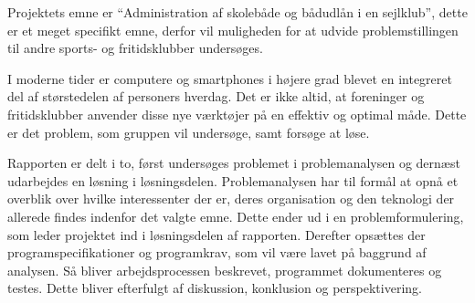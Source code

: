 Projektets emne er ``Administration af skolebåde og bådudlån i en sejlklub'', dette er et meget specifikt emne, derfor vil muligheden for at udvide problemstillingen til andre sports- og fritidsklubber undersøges.

I moderne tider er computere og smartphones i højere grad blevet en integreret del af størstedelen af personers hverdag.  \citep{dstSPogPC} 
Det er ikke altid, at foreninger og fritidsklubber anvender disse nye værktøjer på en effektiv og optimal måde. 
Dette er det problem, som gruppen vil undersøge, samt forsøge at løse.

Rapporten er delt i to, først undersøges problemet i problemanalysen og dernæst udarbejdes en løsning i løsningsdelen. 
Problemanalysen har til formål at opnå et overblik over hvilke interessenter der er, deres organisation og den teknologi der allerede findes indenfor det valgte emne. 
Dette ender ud i en problemformulering, som leder projektet ind i løsningsdelen af rapporten. 
Derefter opsættes der programspecifikationer og programkrav, som vil være lavet på baggrund af analysen. 
Så bliver arbejdsprocessen beskrevet, programmet dokumenteres og testes. 
Dette bliver efterfulgt af diskussion, konklusion og perspektivering.

